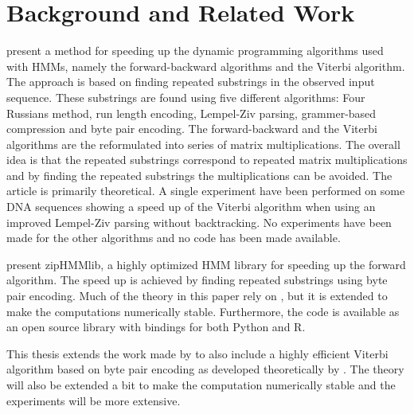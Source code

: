 \chapter{Background and Related Work}
\label{cha:backgr-relat-work}


\citet{lifshits2009speeding} present a method for speeding up the dynamic
programming algorithms used with HMMs, namely the forward-backward algorithms
and the Viterbi algorithm. The approach is based on finding repeated substrings
in the observed input sequence. These substrings are found using five different
algorithms: Four Russians method, run length encoding, Lempel-Ziv parsing,
grammer-based compression and byte pair encoding. The forward-backward and the
Viterbi algorithms are the reformulated into series of matrix
multiplications. The overall idea is that the repeated substrings correspond to
repeated matrix multiplications and by finding the repeated substrings the
multiplications can be avoided. The article is primarily theoretical. A single
experiment have been performed on some DNA sequences showing a speed up of the
Viterbi algorithm when using an improved Lempel-Ziv parsing without
backtracking. No experiments have been made for the other algorithms and no
code has been made available.

\citet{sand2013ziphmmlib} present zipHMMlib, a highly optimized HMM library for
speeding up the forward algorithm. The speed up is achieved by finding repeated
substrings using byte pair encoding. Much of the theory in this paper rely on
\cite{lifshits2009speeding}, but it is extended to make the computations
numerically stable. Furthermore, the code is available as an open source
library with bindings for both Python and R.

This thesis extends the work made by \citet{sand2013ziphmmlib} to also include
a highly efficient Viterbi algorithm based on byte pair encoding as developed
theoretically by \citet{lifshits2009speeding}. The theory will also be extended
a bit to make the computation numerically stable and the experiments will be
more extensive.

